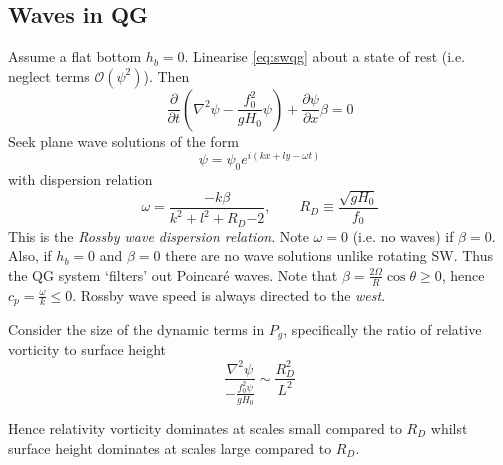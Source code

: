 \documentclass{jknotes}
\begin{document}
\subsection{Waves in QG}
Assume a flat bottom $h_b = 0$. Linearise \eqref{eq:swqg} about a state of
rest (i.e. neglect terms $\mathcal{O}(\psi^2)$). Then
\begin{equation}
	\frac{\partial}{\partial t} \left( \nabla^2 \psi - \frac{f_0^2}{gH_0}
	\psi\right) + \frac{\partial \psi}{\partial x}\beta = 0
\end{equation}
Seek plane wave solutions of the form
\begin{equation}
	\psi = \psi_0 e^{i(kx + ly - \omega t)}
\end{equation}
with dispersion relation
\begin{equation}
	\omega = \frac{-k \beta}{k^2 + l^2 + R_D{-2}}, \hspace{2em} R_D \equiv
	\frac{\sqrt{gH_0}}{f_0}
\end{equation}
This is the \emph{Rossby wave dispersion relation}. Note $\omega = 0$ (i.e. no
waves) if $\beta = 0$. Also, if $h_b = 0$ and $\beta = 0$ there are no wave
solutions unlike rotating SW. Thus the QG system `filters' out Poincar\'{e}
waves. Note that $\beta = \frac{2 \Omega}{R} \cos \theta \ge 0$, hence $c_p =
\frac{\omega}{k} \le 0$. Rossby wave speed is always directed to the
\emph{west}.

Consider the size of the dynamic terms in $P_g$, specifically the ratio of
relative vorticity to surface height
\begin{equation}
	\frac{\nabla^2 \psi}{-\frac{f_0^2 \psi}{g H_0}} \sim \frac{R_D^2}{L^2}
\end{equation}

Hence relativity vorticity dominates at scales small compared to $R_D$ whilst
surface height dominates at scales large compared to $R_D$.
\end{document}

